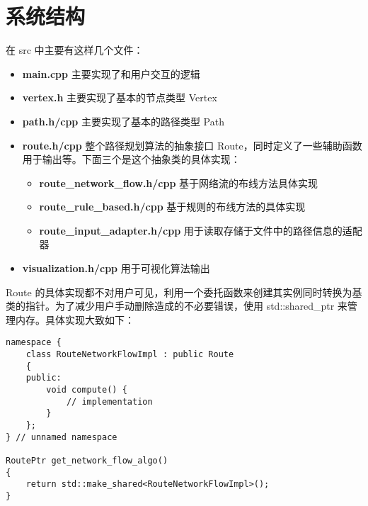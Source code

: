 \section{系统结构} \label{sys-arch}
\qquad 
在 src 中主要有这样几个文件：

\begin{itemize}
\item {\bf main.cpp} 主要实现了和用户交互的逻辑
\item {\bf vertex.h} 主要实现了基本的节点类型 Vertex
\item {\bf path.h/cpp} 主要实现了基本的路径类型 Path
\item {\bf route.h/cpp} 整个路径规划算法的抽象接口 Route，同时定义了一些辅助函数用于输出等。下面三个是这个抽象类的具体实现：
	\begin{itemize}
	\item {\bf route\_network\_flow.h/cpp} 基于网络流的布线方法具体实现
	\item {\bf route\_rule\_based.h/cpp} 基于规则的布线方法的具体实现
	\item {\bf route\_input\_adapter.h/cpp} 用于读取存储于文件中的路径信息的适配器
	\end{itemize}
\item {\bf visualization.h/cpp} 用于可视化算法输出
\end{itemize}

Route 的具体实现都不对用户可见，利用一个委托函数来创建其实例同时转换为基类的指针。为了减少用户手动删除造成的不必要错误，使用 std::shared\_ptr 来管理内存。具体实现大致如下：

\begin{verbatim}
namespace {
    class RouteNetworkFlowImpl : public Route
    {
    public:
        void compute() {
            // implementation
        }
    };
} // unnamed namespace

RoutePtr get_network_flow_algo()
{
    return std::make_shared<RouteNetworkFlowImpl>();
}
\end{verbatim}

